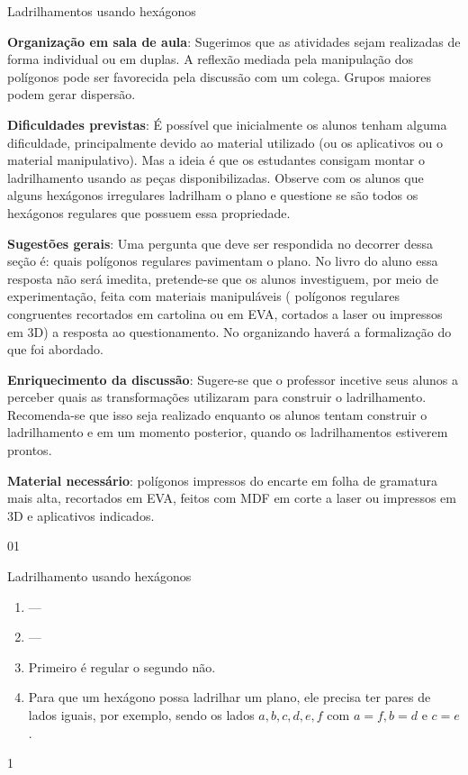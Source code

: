 \begin{sugestions}{Ladrilhamentos usando hexágonos}
{
	\textbf{Organização em sala de aula}: Sugerimos que as atividades sejam realizadas de forma individual ou em duplas. A reflexão mediada pela manipulação dos polígonos pode ser favorecida pela discussão com um colega. Grupos maiores podem gerar dispersão.

	\textbf{Dificuldades previstas}: É possível que inicialmente os alunos tenham alguma dificuldade, principalmente devido ao material utilizado (ou os aplicativos ou o material manipulativo). Mas a ideia é que os estudantes consigam montar o ladrilhamento usando as peças disponibilizadas. Observe com os alunos que alguns hexágonos irregulares ladrilham o plano e questione se são todos os hexágonos regulares que possuem essa propriedade.

	\textbf{Sugestões gerais}: Uma pergunta que deve ser respondida no decorrer dessa seção é: quais polígonos regulares pavimentam o plano. No livro do aluno essa resposta não será imedita, pretende-se que os alunos investiguem, por meio de experimentação, feita com materiais manipuláveis ( polígonos regulares congruentes recortados em cartolina ou em EVA, cortados a laser ou impressos em 3D) a resposta ao questionamento. No organizando haverá a formalização do que foi abordado.  

	\textbf{Enriquecimento da discussão}: Sugere-se que o professor incetive seus alunos a perceber quais as transformações utilizaram para construir o ladrilhamento. Recomenda-se que isso seja realizado enquanto os alunos tentam construir o ladrilhamento e em um momento posterior, quando os ladrilhamentos estiverem prontos.

	\textbf{Material necessário}: polígonos impressos do encarte em folha de gramatura mais alta, recortados em EVA, feitos com MDF em corte a laser ou impressos em 3D e aplicativos indicados.

}{0}{1}
\end{sugestions}
\begin{answer}{Ladrilhamento usando hexágonos}
{
	\begin{enumerate}
	\item ---
	\item ---
	\item Primeiro é regular o segundo não.
	\item Para que um hexágono possa ladrilhar um plano, ele precisa ter pares de lados iguais, por exemplo, sendo os lados $a,b,c,d,e,f$ com $a=f,b=d$ e $c=e$.
	\end{enumerate}
}{1}
\end{answer}
